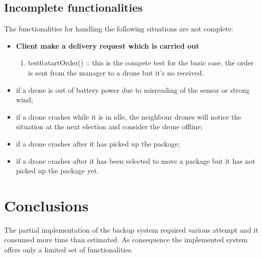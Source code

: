 \documentclass[a4paper, oneside]{memoir}
\begin{document}
\section{Incomplete functionalities}

The functionalities for handling the following situations are not complete:
\begin{itemize}
	\item \textbf{Client make a delivery request which is carried out}
	\begin{enumerate}
	\item \textsf{test6:startOrder()} :: this is the compete test for the basic case, the order is sent from the manager to a drone but it's no received.
	\end{enumerate}
	\item if a drone is out of battery power due to misreading of the sensor or strong wind;
	\item if a drone crashes while it is in idle, the neighbour drones will notice the situation at the next election and consider the drone offline;
	\item if a drone crashes after it has picked up the package;
	\item if a drone crashes after it has been selected to move a package but it has not picked up the package yet.
\end{itemize}


\chapter{Conclusions}
The partial implementation of the backup system required various attempt and it consumed more time than estimated. As consequence the implemented system offers only a limited set of functionalities.
\end{document}
